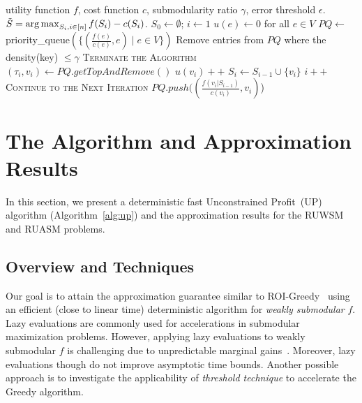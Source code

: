 \documentclass[10pt]{article} %
\DeclareMathOperator*{\argmax}{arg\,max}
\theoremstyle{remark}
\begin{document}
\begin{algorithm}[t]
   \caption{\textsc{UP}($f, c, \gamma, \epsilon$)}
   \label{alg:up}
\begin{algorithmic}[1]
    utility function $f$, cost function $c$, submodularity ratio $\gamma$, error threshold $\epsilon$.
    $\Tilde{S} = \argmax_{S_i, i \in [n]} f(S_i)-c(S_i)$.
   \STATE $S_0 \gets \emptyset$; $i\gets 1$
    \STATE $u(e) \gets 0$ for all $e \in V$ 
    \STATE $PQ \gets$ priority\_queue$(\{(\frac{f(e)}{c(e)}, e) \mid e \in V\})$
    \STATE Remove entries from $PQ$ where the density(key) $\leq \gamma$
            \STATE \textsc{Terminate the Algorithm}  
        \ENDIF
        \STATE $(\tau_i, v_i) \gets PQ.getTopAndRemove()$ 
        \STATE $u(v_i)++$ 
            \STATE $S_i \gets S_{i-1} \cup \{v_i\}$
            \STATE $i++$
            \STATE \textsc{Continue to the Next Iteration} 
        \ENDIF
            \STATE $PQ.push((\frac{f(v_i|S_{i-1})}{c(v_i)}, v_i)$) 
        \ENDIF    
    \ENDWHILE
\end{algorithmic}
\end{algorithm}


\section{The Algorithm and Approximation Results}
\label{sec:unconstrained}
In this section, we present a deterministic fast Unconstrained Profit~(\textsc{UP}) algorithm (Algorithm~\ref{alg:up}) and the approximation results for the RUWSM and RUASM problems. 

\subsection{Overview and Techniques}
\label{sec:overview}
Our goal is to attain the approximation guarantee similar to ROI-Greedy~\cite{jin2021unconstrained} using an efficient (close to linear time) deterministic algorithm for \textit{weakly submodular} $f$. Lazy evaluations \cite{minoux2005accelerated} are commonly used for accelerations in submodular maximization problems. However, applying lazy evaluations to weakly submodular $f$ is challenging due to unpredictable marginal gains~\cite{harshaw2019submodular}. Moreover, lazy evaluations though do not improve asymptotic time bounds. Another possible approach is to  investigate the applicability of \emph{threshold technique} \cite{badanidiyuru2014fast} to accelerate 
the Greedy algorithm.
\end{document}
